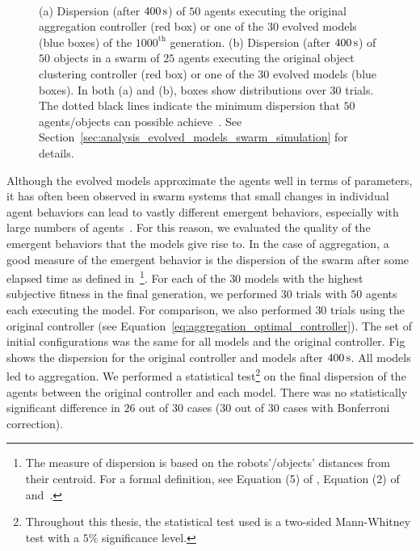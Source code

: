 \begin{figure}[!t]
	\centering
		\\
		\caption{(a) Dispersion (after $\unit[400]{s}$) of $50$ agents executing the original aggregation controller (red box) or one of the $30$ evolved models (blue boxes) of the $1000^\mathrm{th}$ generation. (b) Dispersion (after $\unit[400]{s}$) of $50$ objects in a swarm of $25$ agents executing the original object clustering controller (red box) or one of the $30$ evolved models (blue boxes). In both (a) and (b), boxes show distributions over $30$ trials. The dotted black lines indicate the minimum dispersion that $50$ agents/objects can possible achieve~\cite{Graham1990}. See Section~\ref{sec:analysis_evolved_models_swarm_simulation} for details.\label{fig:model_validation_simulation}}
\end{figure}

Although the evolved models approximate the agents well in terms of parameters, it has often been observed in swarm systems that small changes in individual agent behaviors can lead to vastly different emergent behaviors, especially with large numbers of agents~\cite{Paul2010}. For this reason, we evaluated the quality of the emergent behaviors that the models give rise to. In the case of aggregation, a good measure of the emergent behavior is the dispersion of the swarm after some elapsed time as defined in~\cite{Gauci2014_ijrr}\footnote{The measure of dispersion is based on the robots'/objects' distances from their centroid. For a formal definition, see Equation (5) of \cite{Gauci2014_ijrr}, Equation (2) of~\cite{Melvin2014_aamas} and~\cite{Graham1990}.}. For each of the $30$ models with the highest subjective fitness in the final generation, we performed $30$ trials with $50$ agents each executing the model. For comparison, we also performed $30$ trials using the original controller (see Equation~\eqref{eq:aggregation_optimal_controller}). The set of initial configurations was the same for all models and the original controller. Fig~ shows the dispersion for the original controller and models after $\unit[400]{s}$. All models led to aggregation. We performed a statistical test\footnote{Throughout this thesis, the statistical test used is a two-sided Mann-Whitney test with a $5\%$ significance level.} on the final dispersion of the agents between the original controller and each model. There was no statistically significant difference in $26$ out of $30$ cases ($30$ out of $30$ cases with Bonferroni correction). 

